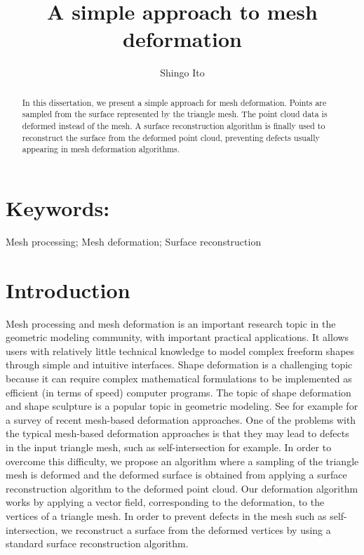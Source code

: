 \documentclass[ams]{U-AizuGT}
\author{Shingo Ito}
\title{A simple approach to mesh deformation}
\begin{document}
\maketitle

\begin{abstract}
In this dissertation, we present a simple approach for mesh deformation. 
Points are sampled from the surface represented by the triangle mesh. 
The point cloud data is deformed instead of the mesh. 
A surface reconstruction algorithm is finally used to reconstruct the surface from the deformed point cloud, preventing defects usually appearing in mesh deformation algorithms.
\end{abstract}


\section*{Keywords:}
Mesh processing; Mesh deformation; Surface reconstruction


\section{Introduction}
Mesh processing and mesh deformation is an important research topic in the geometric modeling community, with important practical applications. It allows users with relatively little technical knowledge to model complex freeform shapes through simple and intuitive interfaces. Shape deformation is a challenging topic because it can require complex mathematical formulations to be implemented as efficient (in terms of speed) computer programs.
The topic of shape deformation and shape sculpture is a popular topic in geometric modeling. See for example \cite{BKPAL10} for a survey of recent mesh-based deformation approaches. One of the problems with the typical mesh-based deformation approaches is that they may lead to defects in the input triangle mesh, such as self-intersection for example. In order to overcome this difficulty, we propose an algorithm where a sampling of the triangle mesh is deformed and the deformed surface is obtained from applying a surface reconstruction algorithm to the deformed point cloud. Our deformation algorithm works by applying a vector field, corresponding to the deformation, to the vertices of a triangle mesh. In order to prevent defects in the mesh such as self-intersection, we reconstruct a surface from the deformed vertices by using a standard surface reconstruction algorithm.
\end{document}
